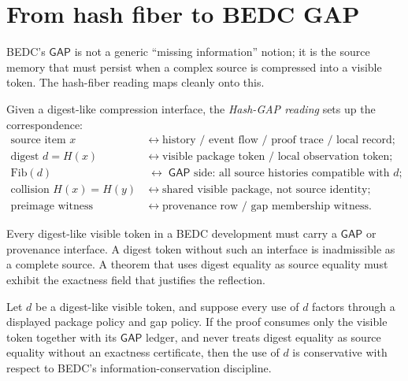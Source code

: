 \section{From hash fiber to BEDC GAP}
\label{sec:hash-like-hash-fiber-to-gap}

BEDC's $\mathsf{GAP}$ is not a generic ``missing information'' notion; it is the source memory that must persist when a complex source is compressed into a visible token. The hash-fiber reading maps cleanly onto this.

\begin{definition}
\label{def:hash-like-hash-gap-reading}
Given a digest-like compression interface, the \emph{Hash-GAP reading} sets up the correspondence:
$$
\begin{aligned}
\text{source item } x &\;\leftrightarrow\; \text{history / event flow / proof trace / local record;} \\
\text{digest } d = H(x) &\;\leftrightarrow\; \text{visible package token / local observation token;} \\
\mathrm{Fib}(d) &\;\leftrightarrow\; \mathsf{GAP}\text{ side: all source histories compatible with }d; \\
\text{collision } H(x) = H(y) &\;\leftrightarrow\; \text{shared visible package, not source identity;} \\
\text{preimage witness} &\;\leftrightarrow\; \text{provenance row / gap membership witness.}
\end{aligned}
$$
\end{definition}

\begin{principle}
\label{prin:hash-like-mandatory-provenance}
Every digest-like visible token in a BEDC development must carry a $\mathsf{GAP}$ or provenance interface. A digest token without such an interface is inadmissible as a complete source. A theorem that uses digest equality as source equality must exhibit the exactness field that justifies the reflection.
\end{principle}

\begin{theorem}
\label{thm:hash-like-hash-gap-conservativity}
Let $d$ be a digest-like visible token, and suppose every use of $d$ factors through a displayed package policy and gap policy. If the proof consumes only the visible token together with its $\mathsf{GAP}$ ledger, and never treats digest equality as source equality without an exactness certificate, then the use of $d$ is conservative with respect to BEDC's information-conservation discipline.
\end{theorem}

